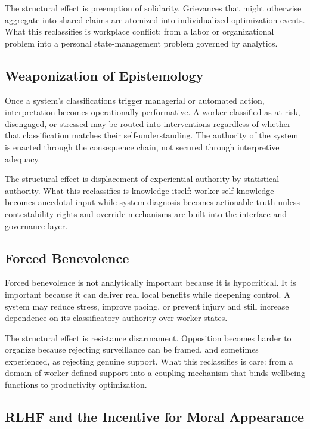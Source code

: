 \documentclass[runningheads]{llncs}
\begin{document}
The structural effect is preemption of solidarity. Grievances that might otherwise aggregate into shared claims are atomized into individualized optimization events. What this reclassifies is workplace conflict: from a labor or organizational problem into a personal state-management problem governed by analytics.

\subsection{Weaponization of Epistemology}

Once a system's classifications trigger managerial or automated action, interpretation becomes operationally performative. A worker classified as at risk, disengaged, or stressed may be routed into interventions regardless of whether that classification matches their self-understanding. The authority of the system is enacted through the consequence chain, not secured through interpretive adequacy.

The structural effect is displacement of experiential authority by statistical authority. What this reclassifies is knowledge itself: worker self-knowledge becomes anecdotal input while system diagnosis becomes actionable truth unless contestability rights and override mechanisms are built into the interface and governance layer.

\subsection{Forced Benevolence}

Forced benevolence is not analytically important because it is hypocritical. It is important because it can deliver real local benefits while deepening control. A system may reduce stress, improve pacing, or prevent injury and still increase dependence on its classificatory authority over worker states.

The structural effect is resistance disarmament. Opposition becomes harder to organize because rejecting surveillance can be framed, and sometimes experienced, as rejecting genuine support. What this reclassifies is care: from a domain of worker-defined support into a coupling mechanism that binds wellbeing functions to productivity optimization.

\subsection{RLHF and the Incentive for Moral Appearance}
\end{document}
